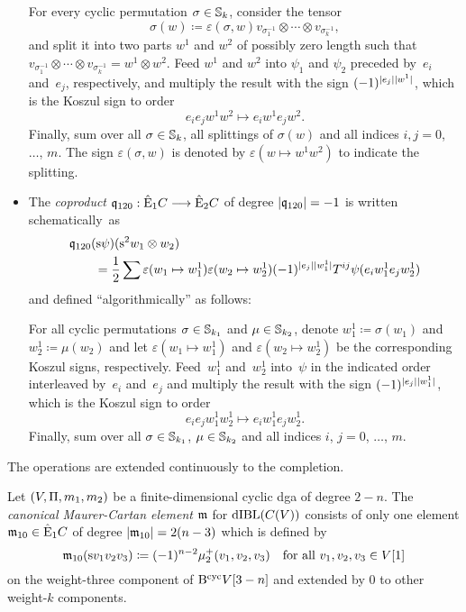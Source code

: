 \documentclass[\MainFolder/Text.tex]{subfiles}
\begin{document}
\begin{Def}
\begin{itemize}
For every cyclic permutation $\sigma\in\mathbb{S}_k$, consider the tensor 
$$\sigma(w) \coloneqq \varepsilon(\sigma,w) v_{\sigma_1^{-1}}\otimes \dotsb \otimes v_{\sigma_k^{-1}}, $$
and split it into two parts $w^1$ and $w^2$ of possibly zero length such that $v_{\sigma_1^{-1}}\otimes \dotsb \otimes v_{\sigma_k^{-1}} = w^1 \otimes w^2$. Feed $w^1$ and $w^2$ into $\psi_1$ and $\psi_2$ preceded by~$e_i$ and~$e_j$, respectively, and multiply the result with the sign $(-1)^{|e_j||w^1|}$, which is the Koszul sign to order 
$$ e_i e_j w^1 w^2 \longmapsto e_i w^1 e_j w^2. $$
Finally, sum over all $\sigma \in \mathbb{S}_k$, all splittings of $\sigma(w)$ and all indices $i,j = 0$,~$\dotsc$, $m$. The sign $\varepsilon(\sigma,w)$ is denoted by $\varepsilon(w\mapsto w^1w^2)$ to indicate the splitting.

\item The \emph{coproduct} $\mathfrak{q}_{120}: \hat{\mathrm{E}}_1 C \longrightarrow \hat{\mathrm{E}}_2 C$ of degree $|\mathfrak{q}_{120}| = -1$ is written schematically~as
$$ \begin{aligned} &\mathfrak{q}_{120}(\mathrm{s} \psi)(\mathrm{s}^2 w_1 \otimes w_2) \\ & \qquad = \frac{1}{2} \sum \varepsilon(w_1\mapsto w_1^1)\varepsilon(w_2\mapsto w_2^1) (-1)^{|e_j||w_1^1|} T^{ij} \psi(e_i w_1^1 e_j w_2^1) \end{aligned}$$
and defined ``algorithmically'' as follows:

For all cyclic permutations $\sigma\in \mathbb{S}_{k_1}$ and $\mu\in \mathbb{S}_{k_2}$, denote $w_1^1\coloneqq \sigma(w_1)$ and $w_2^1\coloneqq \mu(w_2)$ and let $\varepsilon(w_1\mapsto w_1^1)$ and $\varepsilon(w_2\mapsto w_2^1)$ be the corresponding Koszul signs, respectively. Feed~$w_1^1$ and~$w_2^1$ into~$\psi$ in the indicated order interleaved by~$e_i$ and~$e_j$ and multiply the result with the sign $(-1)^{|e_j||w_1^1|}$, which is the Koszul sign to order
$$ e_i e_j w_1^1 w_2^1 \mapsto e_i w_1^1 e_j w_2^1. $$
Finally, sum over all $\sigma\in \mathbb{S}_{k_1}$, $\mu\in\mathbb{S}_{k_2}$ and all indices $i$, $j = 0$, $\dotsc$, $m$.
\end{itemize}
The operations are extended continuously to the completion.
\end{Def}

\begin{Definition} \label{Def:CanonMC}
Let $(V,\Pi,m_1,m_2)$ be a finite-dimensional cyclic dga of degree $2-n$. The \emph{canonical Maurer-Cartan element} $\mathfrak{m}$ for $\mathrm{dIBL}(C(V))$  consists of only one element $\mathfrak{m}_{10}\in \hat{\mathrm{E}}_1 C$ of degree $|\mathfrak{m}_{10}| = 2(n-3)$ which is defined by
\begin{equation*}
\mathfrak{m}_{10}(\mathrm{s} v_1 v_2 v_3) \coloneqq (-1)^{n-2}  \mu_2^+(v_1,v_2,v_3)\quad\text{for all } v_1, v_2, v_3\in V[1]
\end{equation*}
on the weight-three component of $\mathrm{B}^{\mathrm{cyc}} V[3-n]$ and extended by $0$ to other weight-$k$ components.
\end{Definition}
\end{document}
